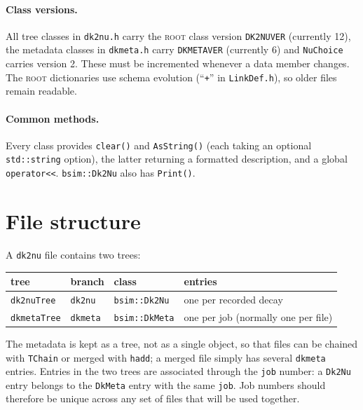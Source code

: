 \documentclass[11pt]{article}
\newcommand{\code}[1]{\texttt{#1}}
\newcommand{\ROOT}{\textsc{root}\xspace}
\newcommand{\dktwonu}{\texttt{dk2nu}\xspace}
\begin{document}
\paragraph{Class versions.}  All tree classes in \code{dk2nu.h} carry the
\ROOT class version \code{DK2NUVER} (currently 12), the metadata classes
in \code{dkmeta.h} carry \code{DKMETAVER} (currently 6) and
\code{NuChoice} carries version 2.  These must be incremented whenever a
data member changes.  The \ROOT dictionaries use schema evolution
(``\code{+}'' in \code{LinkDef.h}), so older files remain readable.

\paragraph{Common methods.}  Every class provides \code{clear()} and
\code{AsString()} (each taking an optional \code{std::string} option),
the latter returning a formatted description, and a global \code{operator<<}.  \code{bsim::Dk2Nu} also has
\code{Print()}.

\section{File structure}\label{sec:file}

A \dktwonu file contains two trees:

\begin{center}\small
\begin{tabular}{llll}
\toprule
\textbf{tree} & \textbf{branch} & \textbf{class} & \textbf{entries} \\
\midrule
\code{dk2nuTree}  & \code{dk2nu}  & \code{bsim::Dk2Nu}  & one per recorded decay \\
\code{dkmetaTree} & \code{dkmeta} & \code{bsim::DkMeta} & one per job (normally one per file) \\
\bottomrule
\end{tabular}
\end{center}

The metadata is kept as a tree, not as a single object, so that files can
be chained with \code{TChain} or merged with \code{hadd}; a merged file
simply has several \code{dkmeta} entries.  Entries in the two trees are
associated through the \code{job} number: a \code{Dk2Nu} entry belongs to
the \code{DkMeta} entry with the same \code{job}.  Job numbers should
therefore be unique across any set of files that will be used together.
\end{document}

